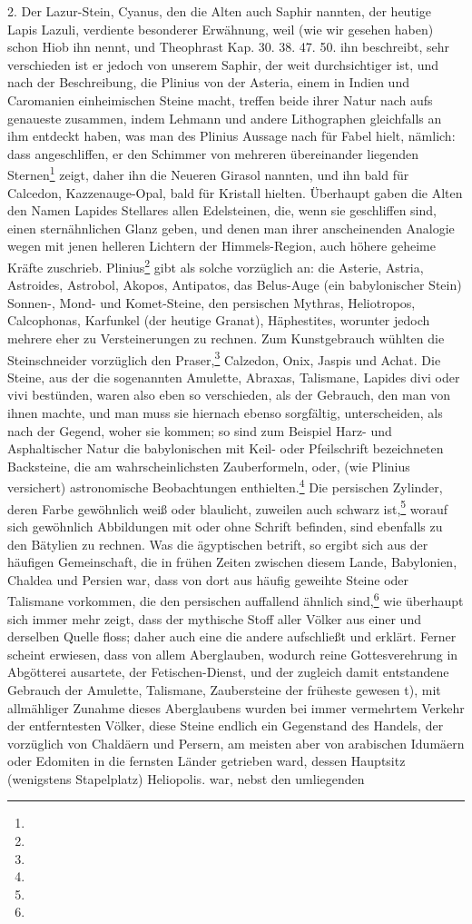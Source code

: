 \documentclass[a4paper, 11pt, oneside, polutonikogreek, german]{article}
\begin{document}
2. Der Lazur-Stein, Cyanus, den die Alten auch Saphir nannten, der heutige Lapis Lazuli, verdiente besonderer Erwähnung, weil (wie wir gesehen haben) schon Hiob ihn nennt, und Theophrast Kap. 30. 38. 47. 50. ihn beschreibt, sehr verschieden ist er jedoch von unserem Saphir, der weit durchsichtiger ist, und nach der Beschreibung, die Plinius von der Asteria, einem in Indien und Caromanien einheimischen Steine macht, treffen beide ihrer Natur nach aufs genaueste zusammen, indem Lehmann und andere Lithographen gleichfalls an ihm entdeckt haben, was man des Plinius Aussage nach für Fabel hielt, nämlich: dass angeschliffen, er den Schimmer von mehreren übereinander liegenden Sternen\footnote{} zeigt, daher ihn die Neueren Girasol nannten, und ihn bald für Calcedon, Kazzenauge-Opal, bald für Kristall hielten. Überhaupt gaben die Alten den Namen Lapides Stellares allen Edelsteinen, die, wenn sie geschliffen sind, einen sternähnlichen Glanz geben, und denen man ihrer anscheinenden Analogie wegen mit jenen helleren Lichtern der Himmels-Region, auch höhere geheime Kräfte zuschrieb. Plinius\footnote{} gibt als solche vorzüglich an: die Asterie, Astria, Astroides, Astrobol, Akopos, Antipatos, das Belus-Auge (ein babylonischer Stein) Sonnen-, Mond- und Komet-Steine, den persischen Mythras, Heliotropos, Calcophonas, Karfunkel (der heutige Granat), Häphestites, worunter jedoch mehrere eher zu Versteinerungen zu rechnen. Zum Kunstgebrauch wühlten die Steinschneider vorzüglich den Praser,\footnote{} Calzedon, Onix, Jaspis und Achat. Die Steine, aus der die sogenannten Amulette, Abraxas, Talismane, Lapides divi oder vivi bestünden, waren also eben so verschieden, als der Gebrauch, den man von ihnen machte, und man muss sie hiernach ebenso sorgfältig, unterscheiden, als nach der Gegend, woher sie kommen; so sind zum Beispiel Harz- und Asphaltischer Natur die babylonischen mit Keil- oder Pfeilschrift bezeichneten Backsteine, die am wahrscheinlichsten Zauberformeln, oder, (wie Plinius versichert) astronomische Beobachtungen enthielten.\footnote{} Die persischen Zylinder, deren Farbe gewöhnlich weiß oder blaulicht, zuweilen auch schwarz ist,\footnote{} worauf sich gewöhnlich Abbildungen mit oder ohne Schrift befinden, sind ebenfalls zu den Bätylien zu rechnen. Was die ägyptischen betrift, so ergibt sich aus der häufigen Gemeinschaft, die in frühen Zeiten zwischen diesem Lande, Babylonien, Chaldea und Persien war, dass von dort aus häufig geweihte Steine oder Talismane vorkommen, die den persischen auffallend ähnlich sind,\footnote{} wie überhaupt sich immer mehr zeigt, dass der mythische Stoff aller Völker aus einer und derselben Quelle floss; daher auch eine die andere aufschließt und erklärt. Ferner scheint erwiesen, dass von allem Aberglauben, wodurch reine Gottesverehrung in Abgötterei ausartete, der Fetischen-Dienst, und der zugleich damit entstandene Gebrauch der Amulette, Talismane, Zaubersteine der früheste gewesen t), mit allmähliger Zunahme dieses Aberglaubens wurden bei immer vermehrtem Verkehr der entferntesten Völker, diese Steine endlich ein Gegenstand des Handels, der vorzüglich von Chaldäern und Persern, am meisten aber von arabischen Idumäern oder Edomiten in die fernsten Länder getrieben ward, dessen Hauptsitz (wenigstens Stapelplatz) Heliopolis. war, nebst den umliegenden 
\end{document}
